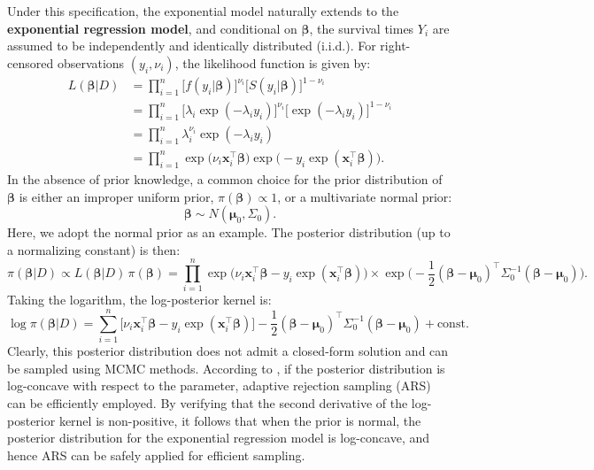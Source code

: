 Under this specification, the exponential model naturally extends to the \textbf{exponential regression model}, and conditional on $\boldsymbol{\beta}$, the survival times $Y_i$ are assumed to be independently and identically distributed (i.i.d.). For right-censored observations $(y_i, \nu_i)$, the likelihood function is given by:
\begin{align*}
L(\boldsymbol{\beta} | D)
&= \prod_{i=1}^n 
\big[ f(y_i | \boldsymbol{\beta}) \big]^{\nu_i}
\big[ S(y_i | \boldsymbol{\beta}) \big]^{1 - \nu_i} \\
&= \prod_{i=1}^n 
\big[ \lambda_i \exp(-\lambda_i y_i) \big]^{\nu_i}
\big[ \exp(-\lambda_i y_i) \big]^{1 - \nu_i} \\
&= \prod_{i=1}^n 
\lambda_i^{\nu_i} 
\exp(-\lambda_i y_i) \\
&= \prod_{i=1}^n 
\exp\big( \nu_i \mathbf{x}_i^\top \boldsymbol{\beta} \big)
\exp\big( - y_i \exp(\mathbf{x}_i^\top \boldsymbol{\beta}) \big).
\end{align*}
In the absence of prior knowledge, a common choice for the prior distribution of $\boldsymbol{\beta}$ is either an improper uniform prior, $\pi(\boldsymbol{\beta}) \propto 1$, or a multivariate normal prior:
$$
\boldsymbol{\beta} \sim N(\boldsymbol{\mu}_0, \Sigma_0).
$$
Here, we adopt the normal prior as an example. The posterior distribution (up to a normalizing constant) is then:
$$
\pi(\boldsymbol{\beta} | D)
\propto L(\boldsymbol{\beta} | D) \, \pi(\boldsymbol{\beta})
= \prod_{i=1}^n 
\exp\big( \nu_i \mathbf{x}_i^\top \boldsymbol{\beta} 
- y_i \exp(\mathbf{x}_i^\top \boldsymbol{\beta}) \big)
\times \exp\Big( -\frac{1}{2} (\boldsymbol{\beta} - \boldsymbol{\mu}_0)^\top \Sigma_0^{-1} (\boldsymbol{\beta} - \boldsymbol{\mu}_0) \Big).
$$
Taking the logarithm, the log-posterior kernel is:
$$
\log \pi(\boldsymbol{\beta} | D) 
= \sum_{i=1}^n \big[ \nu_i \mathbf{x}_i^\top \boldsymbol{\beta} 
- y_i \exp(\mathbf{x}_i^\top \boldsymbol{\beta}) \big]
- \frac{1}{2} (\boldsymbol{\beta} - \boldsymbol{\mu}_0)^\top \Sigma_0^{-1} (\boldsymbol{\beta} - \boldsymbol{\mu}_0) + \text{const}.
$$
Clearly, this posterior distribution does not admit a closed-form solution and can be sampled using MCMC methods. According to \cite{gilks1992adaptive}, if the posterior distribution is log-concave with respect to the parameter, adaptive rejection sampling (ARS) can be efficiently employed. By verifying that the second derivative of the log-posterior kernel is non-positive, it follows that when the prior is normal, the posterior distribution for the exponential regression model is log-concave, and hence ARS can be safely applied for efficient sampling.




